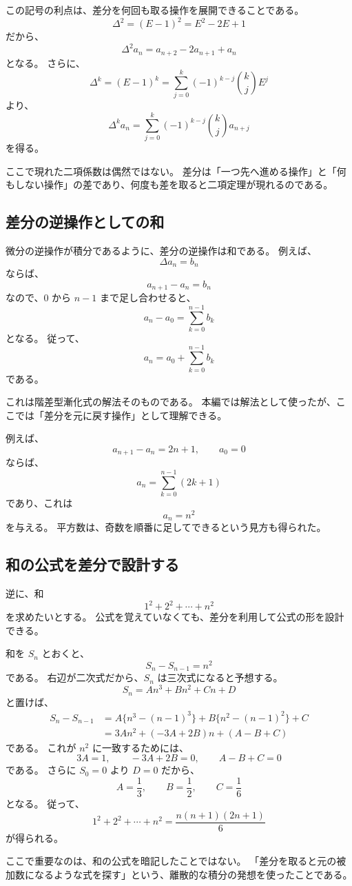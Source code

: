 この記号の利点は、差分を何回も取る操作を展開できることである。
\[
  \Delta^2=(E-1)^2=E^2-2E+1
\]
だから、
\[
  \Delta^2a_n=a_{n+2}-2a_{n+1}+a_n
\]
となる。
さらに、
\[
  \Delta^k=(E-1)^k
  =\sum_{j=0}^{k}(-1)^{k-j}\binom{k}{j}E^j
\]
より、
\[
  \Delta^ka_n
  =\sum_{j=0}^{k}(-1)^{k-j}\binom{k}{j}a_{n+j}
\]
を得る。

ここで現れた二項係数は偶然ではない。
差分は「一つ先へ進める操作」と「何もしない操作」の差であり、何度も差を取ると二項定理が現れるのである。

\subsection{差分の逆操作としての和}

微分の逆操作が積分であるように、差分の逆操作は和である。
例えば、
\[
  \Delta a_n=b_n
\]
ならば、
\[
  a_{n+1}-a_n=b_n
\]
なので、$0$ から $n-1$ まで足し合わせると、
\[
  a_n-a_0=\sum_{k=0}^{n-1}b_k
\]
となる。
従って、
\[
  a_n=a_0+\sum_{k=0}^{n-1}b_k
\]
である。

これは階差型漸化式の解法そのものである。
本編では解法として使ったが、ここでは「差分を元に戻す操作」として理解できる。

例えば、
\[
  a_{n+1}-a_n=2n+1,\qquad a_0=0
\]
ならば、
\[
  a_n=\sum_{k=0}^{n-1}(2k+1)
\]
であり、これは
\[
  a_n=n^2
\]
を与える。
平方数は、奇数を順番に足してできるという見方も得られた。

\subsection{和の公式を差分で設計する}

逆に、和
\[
  1^2+2^2+\cdots+n^2
\]
を求めたいとする。
公式を覚えていなくても、差分を利用して公式の形を設計できる。

和を $S_n$ とおくと、
\[
  S_n-S_{n-1}=n^2
\]
である。
右辺が二次式だから、$S_n$ は三次式になると予想する。
\[
  S_n=An^3+Bn^2+Cn+D
\]
と置けば、
\[
\begin{aligned}
  S_n-S_{n-1}
  &=
  A\{n^3-(n-1)^3\}
  +B\{n^2-(n-1)^2\}
  +C\\
  &=
  3An^2+(-3A+2B)n+(A-B+C)
\end{aligned}
\]
である。
これが $n^2$ に一致するためには、
\[
  3A=1,\qquad -3A+2B=0,\qquad A-B+C=0
\]
である。
さらに $S_0=0$ より $D=0$ だから、
\[
  A=\frac13,\qquad B=\frac12,\qquad C=\frac16
\]
となる。
従って、
\[
  1^2+2^2+\cdots+n^2
  =\frac{n(n+1)(2n+1)}6
\]
が得られる。

ここで重要なのは、和の公式を暗記したことではない。
「差分を取ると元の被加数になるような式を探す」という、離散的な積分の発想を使ったことである。

